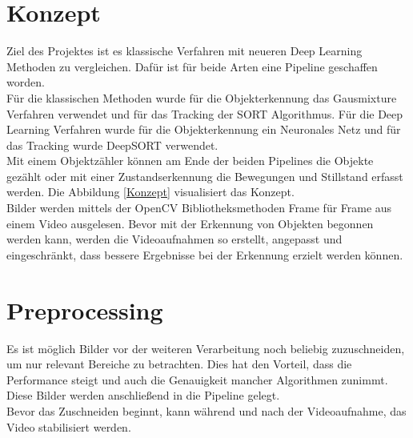 \documentclass[conference]{IEEEtran}
\begin{document}
	\section{Konzept}
	Ziel des Projektes ist es klassische Verfahren mit neueren Deep Learning Methoden zu vergleichen.
	Dafür ist für beide Arten eine Pipeline geschaffen worden.\\
	Für die klassischen Methoden wurde für die Objekterkennung das Gausmixture Verfahren verwendet und für das Tracking der SORT Algorithmus. Für die Deep Learning Verfahren wurde für die Objekterkennung ein Neuronales Netz und für das Tracking wurde DeepSORT verwendet.\\
	Mit einem Objektzähler können am Ende der beiden Pipelines die Objekte gezählt oder mit einer Zustandserkennung die Bewegungen und Stillstand erfasst werden. Die Abbildung \ref{Konzept} visualisiert das Konzept.\\
	Bilder werden mittels der OpenCV Bibliotheksmethoden Frame für Frame aus einem Video ausgelesen.
	Bevor mit der Erkennung von Objekten begonnen werden kann, werden die Videoaufnahmen so erstellt, angepasst und eingeschränkt, dass bessere Ergebnisse bei der Erkennung erzielt werden können.
	\section{Preprocessing}
	Es ist möglich Bilder vor der weiteren Verarbeitung noch beliebig zuzuschneiden, um nur relevant Bereiche zu betrachten. Dies hat den Vorteil, dass die Performance steigt und auch die Genauigkeit mancher Algorithmen zunimmt. Diese Bilder werden anschließend in die Pipeline gelegt.\\
	Bevor das Zuschneiden beginnt, kann während und nach der Videoaufnahme, das Video stabilisiert werden.
\end{document}
